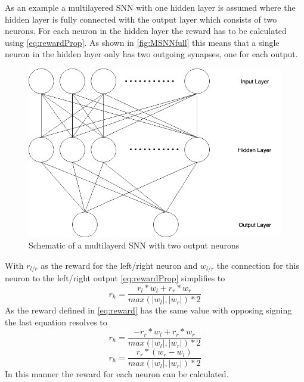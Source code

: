As an example a multilayered SNN with one hidden layer is assumed where the hidden layer is fully connected with the output layer which consists of two neurons. For each neuron in the hidden layer the reward has to be calculated using \autoref{eq:rewardProp}. As shown in \autoref{fig:MSNNfull} this means that a single neuron in the hidden layer only has two outgoing synapses, one for each output.

\begin{figure}[htpb]
  \centering
  \includegraphics[width=\textwidth]{figures/MSNNfu.png}
  \caption{Schematic of a multilayerd SNN with two output neurons}
  \label{fig:MSNNfull}
\end{figure}
With $r_{l/r}$ as the reward for the left/right neuron and $w_{l/r}$ the connection for this neuron to the left/right output \autoref{eq:rewardProp} simplifies to
\begin{equation}
r_h = \frac{ r_l * w_l + r_r * w_r} {max(|w_l|,|w_r|)*2}
\end{equation}
As the reward defined in \autoref{eq:reward} has the same value with opposing signing the last equation resolves to
\begin{equation}\label{eq:rewardPSimp}
r_h = \frac{ -r_r * w_l + r_r * w_r} {max(|w_l|,|w_r|)*2}
\end{equation}
\begin{equation*}
  r_h = \frac{ r_r *(w_r-w_l) } {max(|w_l|,|w_r|)*2}
\end{equation*}
In this manner the reward for each neuron can be calculated.
